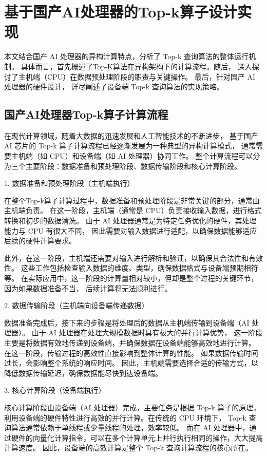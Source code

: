 \chapter{基于国产AI处理器的Top-k算子设计实现}

本文结合国产 AI 处理器的异构计算特点，分析了 Top-k 查询算法的整体运行机制。
具体而言，首先概述了Top-K算法在异构架构下的计算流程。随后，
深入探讨了主机端（CPU）在数据预处理阶段的职责与关键操作。
最后，针对国产 AI 处理器的硬件设计，
详尽阐述了设备端 Top-k 查询算法的实现策略。


\section{国产AI处理器Top-k算子计算流程}
在现代计算领域，随着大数据的迅速发展和人工智能技术的不断进步，
基于国产 AI 芯片的 Top-k 算子计算流程已经逐渐发展为一种典型的异构计算模式，
通常需要主机端（如 CPU）和设备端（如 AI 处理器）协同工作。
整个计算流程可以分为三个主要阶段：数据准备和预处理阶段、数据传输阶段和核心计算阶段。

1. 数据准备和预处理阶段（主机端执行）

在整个Top-k算子计算过程中，数据准备和预处理阶段是非常关键的部分，通常由主机端负责。
在这一阶段，主机端（通常是 CPU）负责接收输入数据，进行格式转换和初步的数据清洗。
由于 AI 处理器通常是为特定任务优化的硬件，其处理能力与 CPU 有很大不同，
因此需要对输入数据进行适配，以确保数据能够适应后续的硬件计算要求。

此外，在这一阶段，主机端还需要对输入进行解析和验证，以确保其合法性和有效性。
这些工作包括检查输入数据的维度、类型，确保数据格式与设备端预期相符等。
在实际应用中，这一阶段的计算量相对较小，但却是整个过程的关键环节，因为如果数据准备不当，
后续计算将无法顺利进行。

2. 数据传输阶段（主机端向设备端传递数据）

数据准备完成后，接下来的步骤是将处理后的数据从主机端传输到设备端（AI 处理器）。
由于 AI 处理器在处理大规模数据时具有极大的并行计算优势，
这一阶段主要是将数据有效地传递到设备端，并确保数据在设备端能够高效地进行计算。
在这一阶段，传输过程的高效性直接影响到整体计算的性能。
如果数据传输时间过长，会影响整个系统的响应时间。
因此，主机端需要选择合适的传输方式，以降低数据传输延迟，确保数据能尽快到达设备端。

3. 核心计算阶段（设备端执行）

核心计算阶段由设备端（AI 处理器）完成，主要任务是根据 Top-k 算子的原理，
利用设备端的硬件特性进行高效的并行计算。在传统的 CPU 环境下，
Top-k 查询算法通常依赖于单线程或少量线程的处理，效率较低。
而在 AI 处理器中，通过硬件的向量化计算指令，可以在多个计算单元上并行执行相同的操作，大大提高计算速度。
因此，设备端的高效计算是整个 Top-k 查询计算流程的核心所在。


